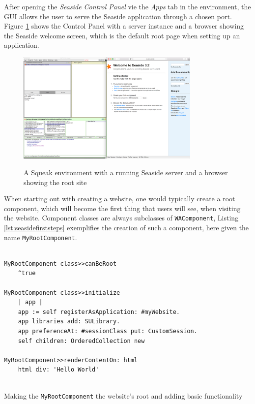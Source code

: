 \documentclass[a4paper,12pt,pagesize,headsepline,oribibl,titlepage]{scrartcl}
\begin{document}
After opening the \emph{Seaside Control Panel} vie the \emph{Apps} tab in the environment, the GUI allows the user to serve the Seaside application through a chosen port. Figure \ref{abb:start} shows the Control Panel with a server instance and a browser showing the Seaside welcome screen, which is the default root page when setting up an application.

\begin{figure}[h]
\begin{center}
\includegraphics*[width=0.8\textwidth]{images/started.png}\\
\caption{A Squeak environment with a running Seaside server and a browser showing the root site}
\label{abb:start}
\end{center}
\end{figure}

When starting out with creating a website, one would typically create a root component, which will become the first thing that users will see, when visiting the website. Component classes are always subclasses of \texttt{WAComponent}, Listing \ref{lst:seasidefirststeps} exemplifies the creation of such a component, here given the name \texttt{MyRootComponent}. 

\begin{listing}[]%
\begin{verbatim}

MyRootComponent class>>canBeRoot
    ^true
    
MyRootComponent class>>initialize
    | app |
    app := self registerAsApplication: #myWebsite.
    app libraries add: SULibrary.
    app preferenceAt: #sessionClass put: CustomSession.
    self children: OrderedCollection new
    
MyRootComponent>>renderContentOn: html
    html div: 'Hello World'
    
\end{verbatim}
\caption{Making the \texttt{MyRootComponent} the website's root and adding basic functionality}
\label{lst:seasidefirststeps}
\end{listing}
\end{document}
